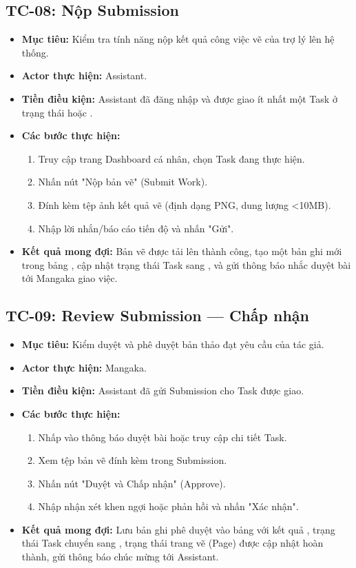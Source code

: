 \subsection{TC-08: Nộp Submission}
\label{subsec:tc08_submit_work}
\begin{itemize}
    \item \textbf{Mục tiêu:} Kiểm tra tính năng nộp kết quả công việc vẽ của trợ lý lên hệ thống.
    \item \textbf{Actor thực hiện:} Assistant.
    \item \textbf{Tiền điều kiện:} Assistant đã đăng nhập và được giao ít nhất một Task ở trạng thái  hoặc .
    \item \textbf{Các bước thực hiện:}
    \begin{enumerate}
        \item Truy cập trang Dashboard cá nhân, chọn Task đang thực hiện.
        \item Nhấn nút "Nộp bản vẽ" (Submit Work).
        \item Đính kèm tệp ảnh kết quả vẽ (định dạng PNG, dung lượng <10MB).
        \item Nhập lời nhắn/báo cáo tiến độ và nhấn "Gửi".
    \end{enumerate}
    \item \textbf{Kết quả mong đợi:} Bản vẽ được tải lên thành công, tạo một bản ghi mới trong bảng , cập nhật trạng thái Task sang , và gửi thông báo nhắc duyệt bài tới Mangaka giao việc.
\end{itemize}

\subsection{TC-09: Review Submission — Chấp nhận}
\label{subsec:tc09_review_approve}
\begin{itemize}
    \item \textbf{Mục tiêu:} Kiểm duyệt và phê duyệt bản thảo đạt yêu cầu của tác giả.
    \item \textbf{Actor thực hiện:} Mangaka.
    \item \textbf{Tiền điều kiện:} Assistant đã gửi Submission cho Task được giao.
    \item \textbf{Các bước thực hiện:}
    \begin{enumerate}
        \item Nhấp vào thông báo duyệt bài hoặc truy cập chi tiết Task.
        \item Xem tệp bản vẽ đính kèm trong Submission.
        \item Nhấn nút "Duyệt và Chấp nhận" (Approve).
        \item Nhập nhận xét khen ngợi hoặc phản hồi và nhấn "Xác nhận".
    \end{enumerate}
    \item \textbf{Kết quả mong đợi:} Lưu bản ghi phê duyệt vào bảng  với kết quả , trạng thái Task chuyển sang , trạng thái trang vẽ (Page) được cập nhật hoàn thành, gửi thông báo chúc mừng tới Assistant.
\end{itemize}

